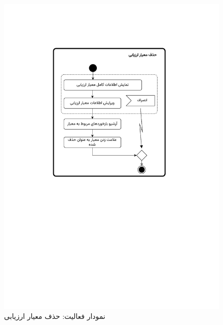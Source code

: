 \begin{figure}
	\centering
	\includegraphics[scale=0.8, page=1]{figs/OOD-activity31-35.pdf}
	\caption{نمودار فعالیت: حذف معیار ارزیابی}
\end{figure}
\FloatBarrier
\newpage

